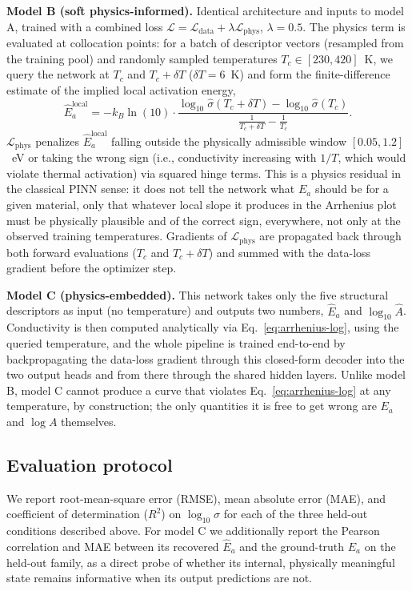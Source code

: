 \documentclass[11pt]{article}
\begin{document}
\textbf{Model B (soft physics-informed).} Identical architecture and inputs to model A, trained with a combined loss $\mathcal L = \mathcal L_{\text{data}} + \lambda \mathcal L_{\text{phys}}$, $\lambda=0.5$. The physics term is evaluated at collocation points: for a batch of descriptor vectors (resampled from the training pool) and randomly sampled temperatures $T_c \in [230, 420]$~K, we query the network at $T_c$ and $T_c+\delta T$ ($\delta T = 6$~K) and form the finite-difference estimate of the implied local activation energy,
\begin{equation}
\hat E_a^{\text{local}} = -k_B \ln(10) \cdot \frac{\log_{10}\hat\sigma(T_c+\delta T) - \log_{10}\hat\sigma(T_c)}{\frac{1}{T_c+\delta T} - \frac{1}{T_c}}.
\end{equation}
$\mathcal L_{\text{phys}}$ penalizes $\hat E_a^{\text{local}}$ falling outside the physically admissible window $[0.05, 1.2]$~eV or taking the wrong sign (i.e., conductivity increasing with $1/T$, which would violate thermal activation) via squared hinge terms. This is a physics residual in the classical PINN sense: it does not tell the network what $E_a$ should be for a given material, only that whatever local slope it produces in the Arrhenius plot must be physically plausible and of the correct sign, everywhere, not only at the observed training temperatures. Gradients of $\mathcal L_{\text{phys}}$ are propagated back through both forward evaluations ($T_c$ and $T_c+\delta T$) and summed with the data-loss gradient before the optimizer step.

\textbf{Model C (physics-embedded).} This network takes only the five structural descriptors as input (no temperature) and outputs two numbers, $\hat E_a$ and $\log_{10}\hat A$. Conductivity is then computed analytically via Eq.~\ref{eq:arrhenius-log}, using the queried temperature, and the whole pipeline is trained end-to-end by backpropagating the data-loss gradient through this closed-form decoder into the two output heads and from there through the shared hidden layers. Unlike model B, model C cannot produce a curve that violates Eq.~\ref{eq:arrhenius-log} at any temperature, by construction; the only quantities it is free to get wrong are $E_a$ and $\log A$ themselves.

\subsection{Evaluation protocol}

We report root-mean-square error (RMSE), mean absolute error (MAE), and coefficient of determination ($R^2$) on $\log_{10}\sigma$ for each of the three held-out conditions described above. For model C we additionally report the Pearson correlation and MAE between its recovered $\hat E_a$ and the ground-truth $E_a$ on the held-out family, as a direct probe of whether its internal, physically meaningful state remains informative when its output predictions are not.
\end{document}
